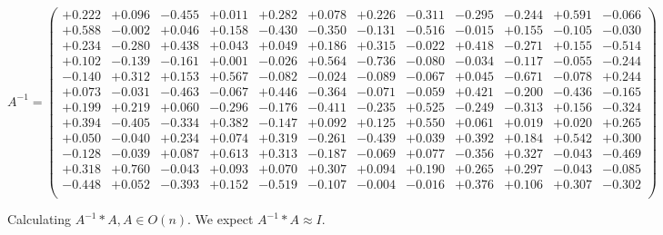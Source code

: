 \documentclass[9pt]{article}
\theoremstyle{plain}
\theoremstyle{definition}
\theoremstyle{remark}
\numberwithin{equation}{section}
\begin{document}
$A^{-1} = \left(
\begin{array}{
cccccccccccc}
+0.222 & +0.096 & -0.455 & +0.011 & +0.282 & +0.078 & +0.226 & -0.311 & -0.295 & -0.244 & +0.591 & -0.066 \\
+0.588 & -0.002 & +0.046 & +0.158 & -0.430 & -0.350 & -0.131 & -0.516 & -0.015 & +0.155 & -0.105 & -0.030 \\
+0.234 & -0.280 & +0.438 & +0.043 & +0.049 & +0.186 & +0.315 & -0.022 & +0.418 & -0.271 & +0.155 & -0.514 \\
+0.102 & -0.139 & -0.161 & +0.001 & -0.026 & +0.564 & -0.736 & -0.080 & -0.034 & -0.117 & -0.055 & -0.244 \\
-0.140 & +0.312 & +0.153 & +0.567 & -0.082 & -0.024 & -0.089 & -0.067 & +0.045 & -0.671 & -0.078 & +0.244 \\
+0.073 & -0.031 & -0.463 & -0.067 & +0.446 & -0.364 & -0.071 & -0.059 & +0.421 & -0.200 & -0.436 & -0.165 \\
+0.199 & +0.219 & +0.060 & -0.296 & -0.176 & -0.411 & -0.235 & +0.525 & -0.249 & -0.313 & +0.156 & -0.324 \\
+0.394 & -0.405 & -0.334 & +0.382 & -0.147 & +0.092 & +0.125 & +0.550 & +0.061 & +0.019 & +0.020 & +0.265 \\
+0.050 & -0.040 & +0.234 & +0.074 & +0.319 & -0.261 & -0.439 & +0.039 & +0.392 & +0.184 & +0.542 & +0.300 \\
-0.128 & -0.039 & +0.087 & +0.613 & +0.313 & -0.187 & -0.069 & +0.077 & -0.356 & +0.327 & -0.043 & -0.469 \\
+0.318 & +0.760 & -0.043 & +0.093 & +0.070 & +0.307 & +0.094 & +0.190 & +0.265 & +0.297 & -0.043 & -0.085 \\
-0.448 & +0.052 & -0.393 & +0.152 & -0.519 & -0.107 & -0.004 & -0.016 & +0.376 & +0.106 & +0.307 & -0.302 \\
\end{array}
\right)$ \newline 

Calculating $A^{-1} *A  ,  A \in O(n)$.   We expect $A^{-1} *A  \approx I$. 
\end{document}
